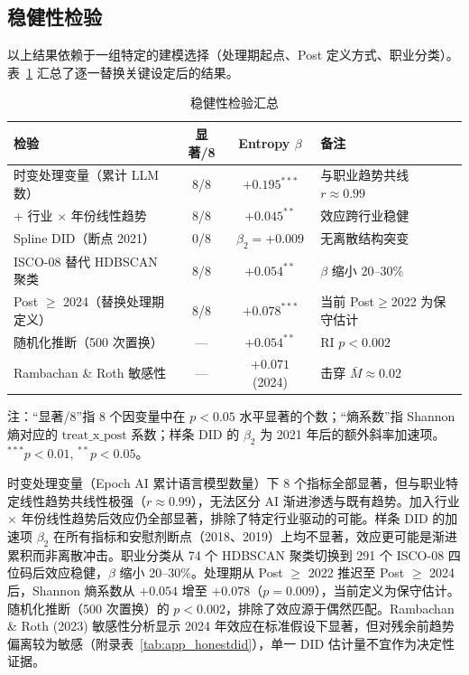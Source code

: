 \documentclass[12pt, a4paper]{article}
\begin{document}
\subsection{稳健性检验}

以上结果依赖于一组特定的建模选择（处理期起点、Post 定义方式、职业分类）。表~\ref{tab:robust} 汇总了逐一替换关键设定后的结果。

\begin{table}[htbp]
\centering
\caption{稳健性检验汇总}
\label{tab:robust}
\begin{threeparttable}
\begin{tabular}{lccl}
\toprule
检验 & 显著/8 & Entropy $\beta$ & 备注 \\
\midrule
时变处理变量（累计 LLM 数） & 8/8 & $+0.195^{***}$ & 与职业趋势共线 $r\approx 0.99$ \\
+ 行业 $\times$ 年份线性趋势  & 8/8 & $+0.045^{**}$  & 效应跨行业稳健 \\
Spline DID（断点 2021）       & 0/8 & $\beta_2 = +0.009$ & 无离散结构突变 \\
ISCO-08 替代 HDBSCAN 聚类    & 8/8 & $+0.054^{**}$  & $\beta$ 缩小 20--30\% \\
Post $\geq$ 2024（替换处理期定义）& 8/8 & $+0.078^{***}$ & 当前 Post$\geq$2022 为保守估计 \\
随机化推断（500 次置换）      & --- & $+0.054^{**}$  & RI $p < 0.002$ \\
Rambachan \& Roth 敏感性        & --- & $+0.071$ (2024) & 击穿 $\bar{M} \approx 0.02$ \\
\bottomrule
\end{tabular}
\begin{tablenotes}[flushleft]
\small
\item 注：“显著/8”指 8 个因变量中在 $p<0.05$ 水平显著的个数；“熵系数”指 Shannon 熵对应的 $\text{treat}\_\text{x}\_\text{post}$ 系数；样条 DID 的 $\beta_2$ 为 2021 年后的额外斜率加速项。$^{***}p<0.01$, $^{**}p<0.05$。
\end{tablenotes}
\end{threeparttable}
\end{table}

时变处理变量（Epoch AI 累计语言模型数量）下 8 个指标全部显著，但与职业特定线性趋势共线性极强（$r \approx 0.99$），无法区分 AI 渐进渗透与既有趋势。加入行业 $\times$ 年份线性趋势后效应仍全部显著，排除了特定行业驱动的可能。样条 DID 的加速项 $\beta_2$ 在所有指标和安慰剂断点（2018、2019）上均不显著，效应更可能是渐进累积而非离散冲击。职业分类从 74 个 HDBSCAN 聚类切换到 291 个 ISCO-08 四位码后效应稳健，$\beta$ 缩小 20--30\%。处理期从 Post $\geq$ 2022 推迟至 Post $\geq$ 2024 后，Shannon 熵系数从 $+0.054$ 增至 $+0.078$（$p = 0.009$），当前定义为保守估计。随机化推断（500 次置换）的 $p < 0.002$，排除了效应源于偶然匹配。Rambachan \& Roth (2023) 敏感性分析显示 2024 年效应在标准假设下显著，但对残余前趋势偏离较为敏感（附录表~\ref{tab:app_honestdid}），单一 DID 估计量不宜作为决定性证据。
\end{document}
